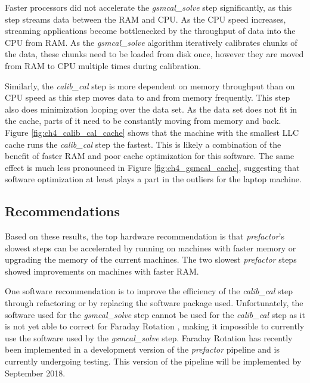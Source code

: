 Faster processors did not accelerate the \textit{gsmcal\_solve} step significantly, as this step streams data between the RAM and CPU. As the CPU speed increases, streaming applications become bottlenecked by the throughput of data into the CPU from RAM. As the \textit{gsmcal\_solve} algorithm iteratively calibrates chunks of the data, these chunks need to be loaded from disk once, however they are moved from RAM to CPU multiple times during calibration. 

Similarly, the \textit{calib\_cal} step is more dependent on memory throughput than on CPU speed as this step moves data to and from memory frequently. This step also does minimization looping over the data set. As the data set does not fit in the cache, parts of it need to be constantly moving from memory and back. Figure \ref{fig:ch4_calib_cal_cache} shows that the machine with the smallest LLC cache runs the \textit{calib\_cal} step the fastest. This is likely a combination of the benefit of faster RAM and poor cache optimization for this software. The same effect is much less pronounced in Figure \ref{fig:ch4_gsmcal_cache}, suggesting that software optimization at least plays a part in the outliers for the laptop machine. 

\subsection{Recommendations}
Based on these results, the top hardware recommendation is that \textit{prefactor}'s slowest steps can be accelerated by running on machines with faster memory or upgrading the memory of the current machines. The two slowest \textit{prefactor} steps showed improvements on machines with faster RAM.  

One software recommendation is to improve the efficiency of the \textit{calib\_cal} step through refactoring or by replacing the software package used. Unfortunately, the software used for the \textit{gsmcal\_solve} step cannot be used for the \textit{calib\_cal} step as it is not yet able to  correct for Faraday Rotation \citep{stefcal}, making it impossible to currently use the software used by the \textit{gsmcal\_solve} step. Faraday Rotation has recently been implemented in a development version of the \textit{prefactor} pipeline and is currently undergoing testing. This version of the pipeline will be implemented by September 2018.

